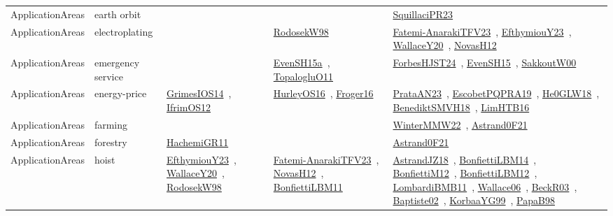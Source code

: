{\begin{longtable}{lp{3cm}>{\raggedright\arraybackslash}p{6cm}>{\raggedright\arraybackslash}p{6cm}>{\raggedright\arraybackslash}p{8cm}}
ApplicationAreas & earth orbit &  &  & \href{../works/SquillaciPR23.pdf}{SquillaciPR23}~\cite{SquillaciPR23}\\
ApplicationAreas & electroplating &  & \href{../works/RodosekW98.pdf}{RodosekW98}~\cite{RodosekW98} & \href{../works/Fatemi-AnarakiTFV23.pdf}{Fatemi-AnarakiTFV23}~\cite{Fatemi-AnarakiTFV23}, \href{../works/EfthymiouY23.pdf}{EfthymiouY23}~\cite{EfthymiouY23}, \href{../works/WallaceY20.pdf}{WallaceY20}~\cite{WallaceY20}, \href{../works/NovasH12.pdf}{NovasH12}~\cite{NovasH12}\\
ApplicationAreas & emergency service &  & \href{../works/EvenSH15a.pdf}{EvenSH15a}~\cite{EvenSH15a}, \href{../works/TopalogluO11.pdf}{TopalogluO11}~\cite{TopalogluO11} & \href{../works/ForbesHJST24.pdf}{ForbesHJST24}~\cite{ForbesHJST24}, \href{../works/EvenSH15.pdf}{EvenSH15}~\cite{EvenSH15}, \href{../works/SakkoutW00.pdf}{SakkoutW00}~\cite{SakkoutW00}\\
ApplicationAreas & energy-price & \href{../works/GrimesIOS14.pdf}{GrimesIOS14}~\cite{GrimesIOS14}, \href{../works/IfrimOS12.pdf}{IfrimOS12}~\cite{IfrimOS12} & \href{../works/HurleyOS16.pdf}{HurleyOS16}~\cite{HurleyOS16}, \href{../works/Froger16.pdf}{Froger16}~\cite{Froger16} & \href{../works/PrataAN23.pdf}{PrataAN23}~\cite{PrataAN23}, \href{../works/EscobetPQPRA19.pdf}{EscobetPQPRA19}~\cite{EscobetPQPRA19}, \href{../works/He0GLW18.pdf}{He0GLW18}~\cite{He0GLW18}, \href{../works/BenediktSMVH18.pdf}{BenediktSMVH18}~\cite{BenediktSMVH18}, \href{../works/LimHTB16.pdf}{LimHTB16}~\cite{LimHTB16}\\
ApplicationAreas & farming &  &  & \href{../works/WinterMMW22.pdf}{WinterMMW22}~\cite{WinterMMW22}, \href{../works/Astrand0F21.pdf}{Astrand0F21}~\cite{Astrand0F21}\\
ApplicationAreas & forestry & \href{../works/HachemiGR11.pdf}{HachemiGR11}~\cite{HachemiGR11} &  & \href{../works/Astrand0F21.pdf}{Astrand0F21}~\cite{Astrand0F21}\\
ApplicationAreas & hoist & \href{../works/EfthymiouY23.pdf}{EfthymiouY23}~\cite{EfthymiouY23}, \href{../works/WallaceY20.pdf}{WallaceY20}~\cite{WallaceY20}, \href{../works/RodosekW98.pdf}{RodosekW98}~\cite{RodosekW98} & \href{../works/Fatemi-AnarakiTFV23.pdf}{Fatemi-AnarakiTFV23}~\cite{Fatemi-AnarakiTFV23}, \href{../works/NovasH12.pdf}{NovasH12}~\cite{NovasH12}, \href{../works/BonfiettiLBM11.pdf}{BonfiettiLBM11}~\cite{BonfiettiLBM11} & \href{../works/AstrandJZ18.pdf}{AstrandJZ18}~\cite{AstrandJZ18}, \href{../works/BonfiettiLBM14.pdf}{BonfiettiLBM14}~\cite{BonfiettiLBM14}, \href{../works/BonfiettiM12.pdf}{BonfiettiM12}~\cite{BonfiettiM12}, \href{../works/BonfiettiLBM12.pdf}{BonfiettiLBM12}~\cite{BonfiettiLBM12}, \href{../works/LombardiBMB11.pdf}{LombardiBMB11}~\cite{LombardiBMB11}, \href{../works/Wallace06.pdf}{Wallace06}~\cite{Wallace06}, \href{../works/BeckR03.pdf}{BeckR03}~\cite{BeckR03}, \href{../works/Baptiste02.pdf}{Baptiste02}~\cite{Baptiste02}, \href{../works/KorbaaYG99.pdf}{KorbaaYG99}~\cite{KorbaaYG99}, \href{../works/PapaB98.pdf}{PapaB98}~\cite{PapaB98}\\

\end{longtable}}
